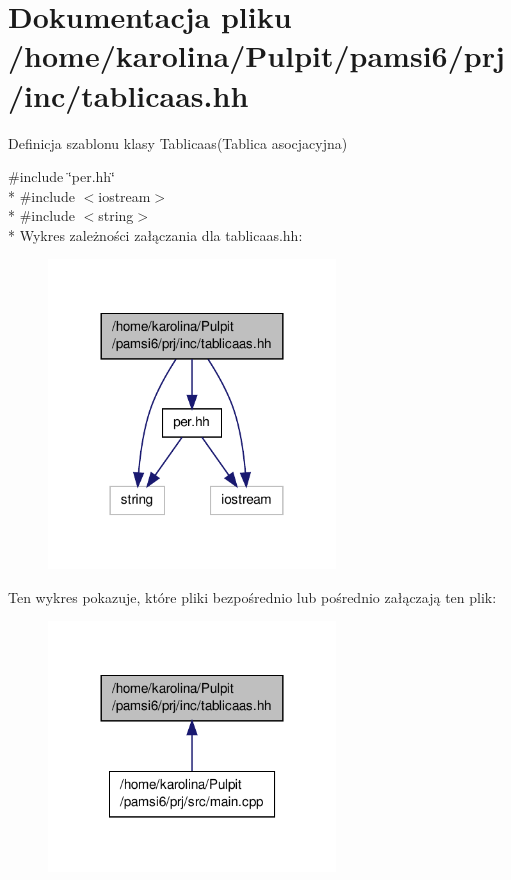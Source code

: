 \hypertarget{tablicaas_8hh}{\section{Dokumentacja pliku /home/karolina/\-Pulpit/pamsi6/prj/inc/tablicaas.hh}
\label{tablicaas_8hh}
}


Definicja szablonu klasy Tablicaas(\-Tablica asocjacyjna)  


{\ttfamily \#include \char`\"{}per.\-hh\char`\"{}}\\*
{\ttfamily \#include $<$iostream$>$}\\*
{\ttfamily \#include $<$string$>$}\\*
Wykres zależności załączania dla tablicaas.\-hh\-:\nopagebreak
\begin{figure}[H]
\begin{center}
\leavevmode
\includegraphics[width=216pt]{tablicaas_8hh__incl}
\end{center}
\end{figure}
Ten wykres pokazuje, które pliki bezpośrednio lub pośrednio załączają ten plik\-:\nopagebreak
\begin{figure}[H]
\begin{center}
\leavevmode
\includegraphics[width=216pt]{tablicaas_8hh__dep__incl}
\end{center}
\end{figure}
